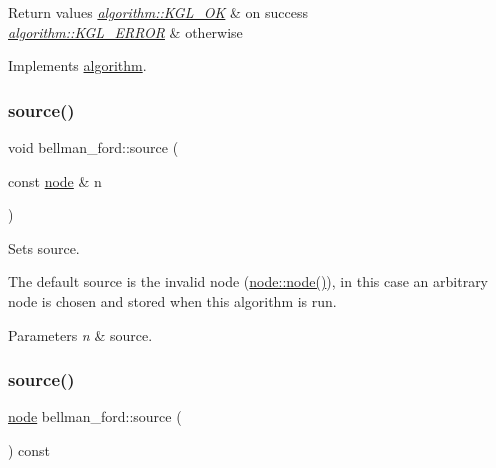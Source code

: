 \begin{DoxyRetVals}{Return values}
{\em \mbox{\hyperlink{classalgorithm_af1a0078e153aa99c24f9bdf0d97f6710aae4c1cd7fe8d8cf4b143241a6e7c31cf}{algorithm\+::\+K\+G\+L\+\_\+\+OK}}} & on success \\
\hline
{\em \mbox{\hyperlink{classalgorithm_af1a0078e153aa99c24f9bdf0d97f6710ae67bf27b2ef31f73e545a7f9f4a69556}{algorithm\+::\+K\+G\+L\+\_\+\+E\+R\+R\+OR}}} & otherwise \\
\hline
\end{DoxyRetVals}


Implements \mbox{\hyperlink{classalgorithm_a734b189509a8d6b56b65f8ff772d43ca}{algorithm}}.

\mbox{\label{classbellman__ford_a98cad540fd2d211c1ba44bb6fa8416f3}} 
\subsubsection{\texorpdfstring{source()}{source()}\hspace{0.1cm}{\footnotesize\ttfamily [1/2]}}
{\footnotesize\ttfamily void bellman\+\_\+ford\+::source (\begin{DoxyParamCaption}\item[{const \mbox{\hyperlink{classnode}{node}} \&}]{n }\end{DoxyParamCaption})\hspace{0.3cm}{\ttfamily [inline]}}



Sets source. 

The default source is the invalid node (\mbox{\hyperlink{classnode_ad603259398d5667e3b97a6322a2bcc20}{node\+::node()}}), in this case an arbitrary node is chosen and stored when this algorithm is run.


\begin{DoxyParams}{Parameters}
{\em n} & source. \\
\hline
\end{DoxyParams}
\mbox{\label{classbellman__ford_a86e3fe7fe71d7569cc73e9e531d58539}} 
\subsubsection{\texorpdfstring{source()}{source()}\hspace{0.1cm}{\footnotesize\ttfamily [2/2]}}
{\footnotesize\ttfamily \mbox{\hyperlink{classnode}{node}} bellman\+\_\+ford\+::source (\begin{DoxyParamCaption}{ }\end{DoxyParamCaption}) const\hspace{0.3cm}{\ttfamily [inline]}}



